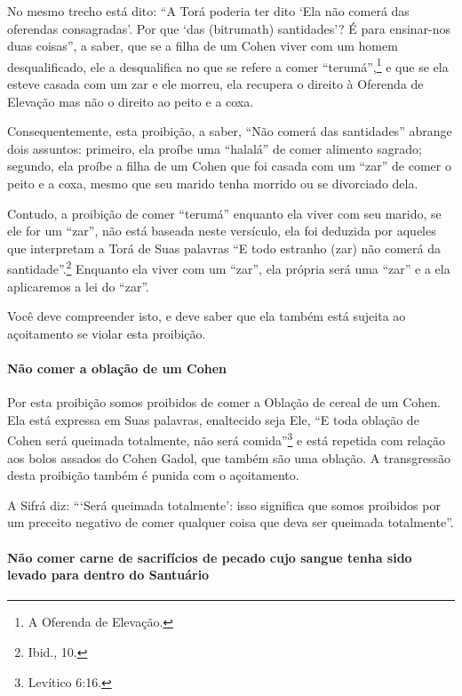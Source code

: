 No mesmo trecho está dito: ``A Torá poderia ter dito `Ela não comerá
das oferendas consagradas'. Por que `das (bitrumath) santidades'? É para
ensinar-nos duas coisas'', a saber, que se a filha de um Cohen viver
com um homem desqualificado, ele a desqualifica no que se refere a comer
``terumá'',\footnote{A Oferenda de Elevação.} e que se ela esteve casada com um
zar\starr{} e ele morreu, ela recupera o direito à
Oferenda de Elevação mas não o direito ao peito e a coxa.
 
Consequentemente, esta proibição, a saber, ``Não comerá das santidades''
abrange dois assuntos: primeiro, ela proíbe uma ``halalá'' de comer
alimento sagrado; segundo, ela proíbe a filha de um Cohen que foi
casada com um ``zar'' de comer o peito e a coxa, mesmo que seu marido
tenha morrido ou se divorciado dela.

Contudo, a proibição de comer ``terumá'' enquanto ela viver com seu
marido, se ele for um ``zar'', não está baseada neste versículo, ela foi
deduzida por aqueles que interpretam a Torá de Suas palavras ``E todo
estranho (zar) não comerá da santidade''.\footnote{Ibid., 10.} Enquanto ela viver
com um ``zar'', ela própria será uma ``zar'' e a ela aplicaremos a lei
do ``zar''.

Você deve compreender isto, e deve saber que ela também está sujeita ao
açoitamento se violar esta proibição.

\paragraph{Não comer a oblação de um Cohen}

Por esta proibição somos proibidos de comer a Oblação de cereal de um
Cohen. Ela está expressa em Suas palavras, enaltecido seja Ele, ``E
toda oblação de Cohen será queimada totalmente, não será comida''\footnote{Levítico 6:16.} e está repetida com relação aos bolos assados do Cohen Gadol, que também são uma oblação. A transgressão desta proibição
também é punida com o açoitamento.

A Sifrá diz: ```Será queimada totalmente': isso significa que somos
proibidos por um preceito negativo de comer qualquer coisa que deva ser
queimada totalmente''.

\paragraph{Não comer carne de sacrifícios de pecado cujo sangue tenha sido
levado para dentro do Santuário}

